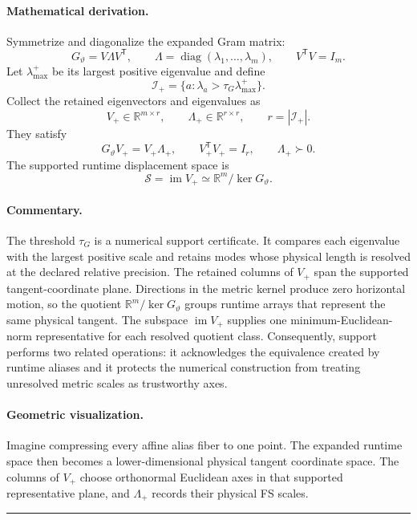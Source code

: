 \documentclass[10pt,twocolumn]{article}
\newcommand{\R}{\mathbb R}
\newcommand{\diag}{\operatorname{diag}}
\newcommand{\conceptbreak}{%
  \par\medskip\noindent
  {\color{black!30}\rule{\columnwidth}{0.35pt}}%
  \par\medskip}
\newcommand{\mathderiv}{\paragraph{Mathematical derivation.}}
\newcommand{\commentaryblock}{\paragraph{Commentary.}}
\newcommand{\geometryblock}{\paragraph{Geometric visualization.}}
\begin{document}
\mathderiv Symmetrize and diagonalize the expanded Gram matrix:
\begin{equation}
G_\vartheta=V\Lambda V^{\mathsf T},\qquad
\Lambda=\diag(\lambda_1,\ldots,\lambda_m),\qquad
V^{\mathsf T}V=I_m.
\label{eq:gram-spectrum}
\end{equation}
Let \(\lambda_{\max}^+\) be its largest positive eigenvalue and define
\begin{equation}
\mathcal I_+=\{a:\lambda_a>\tau_G\lambda_{\max}^+\}.
\label{eq:support-index}
\end{equation}
Collect the retained eigenvectors and eigenvalues as
\begin{equation}
V_+\in\R^{m\times r},\qquad
\Lambda_+\in\R^{r\times r},\qquad
r=|\mathcal I_+|.
\label{eq:supported-factors}
\end{equation}
They satisfy
\begin{equation}
G_\vartheta V_+=V_+\Lambda_+,\qquad
V_+^{\mathsf T}V_+=I_r,\qquad
\Lambda_+\succ0.
\label{eq:supported-eigenproblem}
\end{equation}
The supported runtime displacement space is
\begin{equation}
\mathcal S=\operatorname{im}V_+\simeq
\R^m/\ker G_\vartheta.
\label{eq:supported-quotient}
\end{equation}

\commentaryblock The threshold \(\tau_G\) is a numerical support certificate.
It compares each eigenvalue with the largest positive scale and retains modes
whose physical length is resolved at the declared relative precision. The
retained columns of \(V_+\) span the supported tangent-coordinate plane.
Directions in the metric kernel produce zero horizontal motion, so the quotient
\(\R^m/\ker G_\vartheta\) groups runtime arrays that represent the same
physical tangent. The subspace \(\operatorname{im}V_+\) supplies one
minimum-Euclidean-norm representative for each resolved quotient class.
Consequently, support performs two related operations: it acknowledges the
equivalence created by runtime aliases and it protects the numerical
construction from treating unresolved metric scales as trustworthy axes.

\geometryblock Imagine compressing every affine alias fiber to one point. The
expanded runtime space then becomes a lower-dimensional physical tangent
coordinate space. The columns of \(V_+\) choose orthonormal Euclidean axes in
that supported representative plane, and \(\Lambda_+\) records their physical
FS scales.

\conceptbreak
\end{document}
